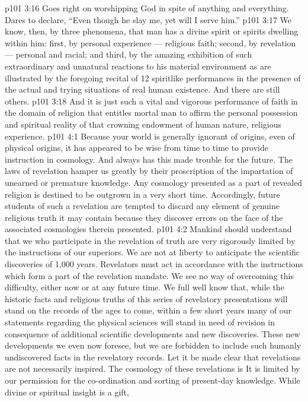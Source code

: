 \vs p101 3:16 \bibnobreakspace Goes right on worshipping God in spite of anything and everything. Dares to declare, “Even though he slay me, yet will I serve him.”
\vs p101 3:17 \pc We know, then, by three phenomena, that man has a divine spirit or spirits dwelling within him: first, by personal experience --- religious faith; second, by revelation --- personal and racial; and third, by the amazing exhibition of such extraordinary and unnatural reactions to his material environment as are illustrated by the foregoing recital of 12 spiritlike performances in the presence of the actual and trying situations of real human existence. And there are still others.
\vs p101 3:18 And it is just such a vital and vigorous performance of faith in the domain of religion that entitles mortal man to affirm the personal possession and spiritual reality of that crowning endowment of human nature, religious experience.
\vs p101 4:1 Because your world is generally ignorant of origins, even of physical origins, it has appeared to be wise from time to time to provide instruction in cosmology. And always has this made trouble for the future. The laws of revelation hamper us greatly by their proscription of the impartation of unearned or premature knowledge. Any cosmology presented as a part of revealed religion is destined to be outgrown in a very short time. Accordingly, future students of such a revelation are tempted to discard any element of genuine religious truth it may contain because they discover errors on the face of the associated cosmologies therein presented.
\vs p101 4:2 Mankind should understand that we who participate in the revelation of truth are very rigorously limited by the instructions of our superiors. We are not at liberty to anticipate the scientific discoveries of 1,000 years. Revelators must act in accordance with the instructions which form a part of the revelation mandate. We see no way of overcoming this difficulty, either now or at any future time. We full well know that, while the historic facts and religious truths of this series of revelatory presentations will stand on the records of the ages to come, within a few short years many of our statements regarding the physical sciences will stand in need of revision in consequence of additional scientific developments and new discoveries. These new developments we even now foresee, but we are forbidden to include such humanly undiscovered facts in the revelatory records. Let it be made clear that revelations are not necessarily inspired. The cosmology of these revelations is  It is limited by our permission for the co\hyp{}ordination and sorting of present\hyp{}day knowledge. While divine or spiritual insight is a gift, 
